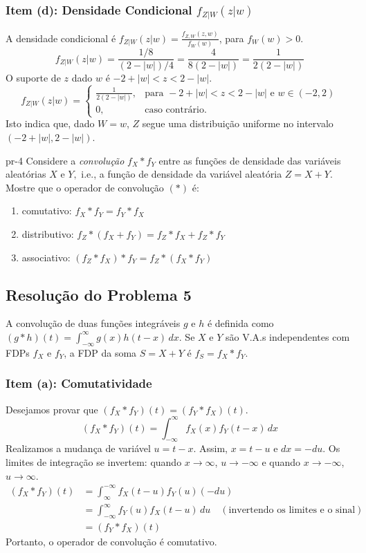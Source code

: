 \documentclass[
]{article}
\begin{document}
\subsubsection*{Item (d): Densidade Condicional $f_{Z|W}(z|w)$}

A densidade condicional é
\(f_{Z|W}(z|w) = \frac{f_{Z,W}(z,w)}{f_W(w)}\), para \(f_W(w)>0\). \[
f_{Z|W}(z|w) = \frac{1/8}{(2-|w|)/4} = \frac{4}{8(2-|w|)} = \frac{1}{2(2-|w|)}
\] O suporte de \(z\) dado \(w\) é \(-2+|w| < z < 2-|w|\). \[
f_{Z|W}(z|w) = 
\begin{cases}
    \frac{1}{2(2-|w|)}, & \text{para } -2+|w| < z < 2-|w| \text{ e } w \in (-2,2) \\
    0, &  \text{caso contrário.}
\end{cases}
\] Isto indica que, dado \(W=w\), \(Z\) segue uma distribuição uniforme
no intervalo \((-2+|w|, 2-|w|)\).

\newpage
\begin{problema}{}{pr-4}
    Considere  a {\it convolução} $f_X * f_Y$ entre as funções de densidade das variáveis aleatórias  $X$ e $Y,$ i.e., a função de densidade da variável aleatória $Z=X+Y.$ Mostre que o operador de convolução $ ( * )$ é: 
    \begin{enumerate}
        \item comutativo: $f_X * f_Y = f_Y * f_X$
        \item distributivo: $f_Z*(f_X+f_Y ) = f_Z*f_X+f_Z*f_Y$
        \item  associativo: $(f_Z * f_X) * f_Y = f_Z *(f_X * f_Y )$
    \end{enumerate}
\end{problema}

\subsection*{Resolução do Problema 5}

A convolução de duas funções integráveis \(g\) e \(h\) é definida como
\((g * h)(t) = \int_{-\infty}^{\infty} g(x) h(t-x) \,dx\). Se \(X\) e
\(Y\) são V.A.s independentes com FDPs \(f_X\) e \(f_Y\), a FDP da soma
\(S=X+Y\) é \(f_S = f_X * f_Y\).

\subsubsection*{Item (a): Comutatividade}

Desejamos provar que \((f_X * f_Y)(t) = (f_Y * f_X)(t)\).
\[ (f_X * f_Y)(t) = \int_{-\infty}^{\infty} f_X(x) f_Y(t-x) \,dx \]
Realizamos a mudança de variável \(u = t-x\). Assim, \(x = t-u\) e
\(dx = -du\). Os limites de integração se invertem: quando
\(x \to \infty\), \(u \to -\infty\) e quando \(x \to -\infty\),
\(u \to \infty\). \begin{align*}
    (f_X * f_Y)(t) &= \int_{\infty}^{-\infty} f_X(t-u) f_Y(u) (-du) \\
    &= \int_{-\infty}^{\infty} f_Y(u) f_X(t-u) \,du \quad (\text{invertendo os limites e o sinal}) \\
    &= (f_Y * f_X)(t)
\end{align*} Portanto, o operador de convolução é comutativo.
\end{document}
